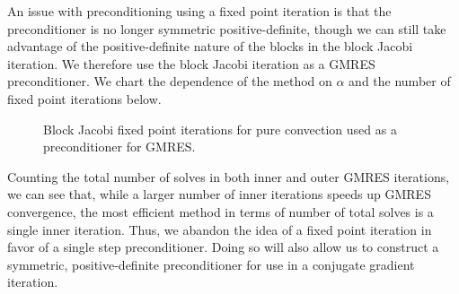 \documentclass{article}
\begin{document}
An issue with preconditioning using a fixed point iteration is that the preconditioner is no longer symmetric positive-definite, though we can still take advantage of the positive-definite nature of the blocks in the block Jacobi iteration.  We therefore use the block Jacobi iteration as a GMRES preconditioner.  We chart the dependence of the method on $\alpha$ and the number of fixed point iterations below.  
\begin{figure}
\centering
{}
\caption{Block Jacobi fixed point iterations for pure convection used as a preconditioner for GMRES.}
\end{figure}
Counting the total number of solves in both inner and outer GMRES iterations, we can see that, while a larger number of inner iterations speeds up GMRES convergence, the most efficient method in terms of number of total solves is a single inner iteration.  Thus, we abandon the idea of a fixed point iteration in favor of a single step preconditioner.  Doing so will also allow us to construct a symmetric, positive-definite preconditioner for use in a conjugate gradient iteration.  
%
%
\end{document}

